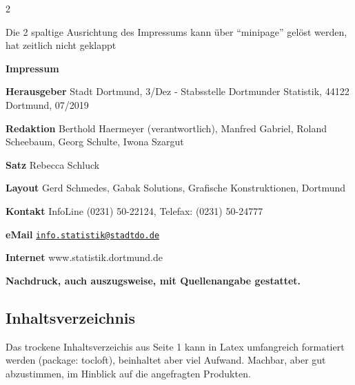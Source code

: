 \documentclass[
  a4paper,
  twoside]{article}
\begin{document}
\begin {multicols}{2}

\vspace*{\textheight}

\columnbreak

\vspace*{12cm}

Die 2 spaltige Ausrichtung des Impressums kann über ``minipage'' gelöst werden, hat zeitlich nicht geklappt

\textcolor{DoStat}{\textbf{Impressum}}

\textbf{Herausgeber} \hspace{0.5cm} Stadt Dortmund, 3/Dez - Stabsstelle Dortmunder Statistik, 44122 Dortmund, 07/2019

\textbf{Redaktion} \hspace{0.5cm} Berthold Haermeyer (verantwortlich), Manfred Gabriel, Roland Scheebaum, Georg Schulte, Iwona Szargut

\textbf{Satz} \hspace{0.5cm} Rebecca Schluck

\textbf{Layout} \hspace{0.5cm} Gerd Schmedes, Gabak Solutions, Grafische Konstruktionen, Dortmund

\textbf{Kontakt} \hspace{0.5cm} InfoLine (0231) 50-22124, Telefax: (0231) 50-24777

\textbf{eMail} \hspace{0.5cm} \href{mailto:info.statistik@stadtdo.de}{\nolinkurl{info.statistik@stadtdo.de}}

\textbf{Internet} \hspace{0.5cm} www.statistik.dortmund.de

\hspace{2cm}\textcolor{DoStat}{\textbf{Nachdruck, auch auszugsweise, mit Quellenangabe gestattet.}}

\end {multicols}

\newpage

\hypertarget{inhaltsverzeichnis}{%
\subsection{Inhaltsverzeichnis}\label{inhaltsverzeichnis}}

Das trockene Inhaltsverzeichis aus Seite 1 kann in Latex umfangreich formatiert werden (package: tocloft), beinhaltet aber viel Aufwand. Machbar, aber gut abzustimmen, im Hinblick auf die angefragten Produkten.
\end{document}
